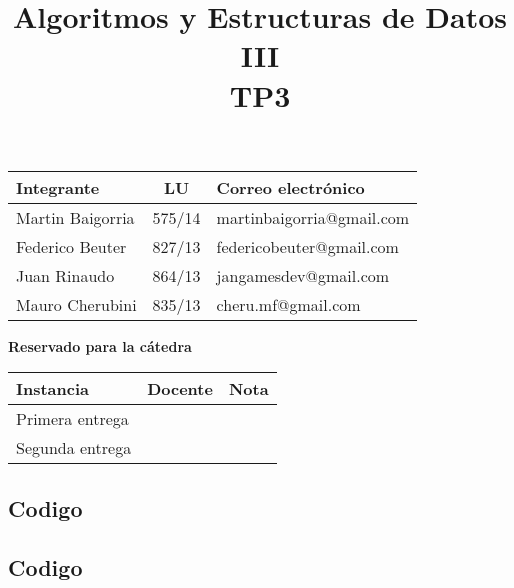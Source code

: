 \documentclass[10pt,a4paper]{article}
\title{Algoritmos y Estructuras de Datos III \\ TP3}
\begin{document}

\maketitle

\bigskip

\begin{table}[h]
\centering
\begin{tabular}{|l l l|}
\hline
Integrante       & \multicolumn{1}{c}{LU}     & Correo electrónico        \\ \hline
Martin Baigorria & \multicolumn{1}{c}{575/14} & martinbaigorria@gmail.com \\ 
Federico Beuter & 827/13                      & federicobeuter@gmail.com \\
Juan Rinaudo & 864/13                      & jangamesdev@gmail.com \\ 
Mauro Cherubini & 835/13                      & cheru.mf@gmail.com \\ \hline
\end{tabular}
\end{table}

\vfill

\begin{center}
\textbf{Reservado para la cátedra}
\end{center}
\begin{table}[h]
\centering
\begin{tabular}{|l|l|l|}
\hline
Instancia       & Docente & Nota \\ \hline
Primera entrega &         &      \\ \hline
Segunda entrega &         &      \\ \hline
\end{tabular}
\end{table}

\newpage
\tableofcontents
\newpage



\newpage


\newpage

\newpage
\subsection{Codigo}

\newpage


\newpage

\newpage
\subsection{Codigo}

\newpage


\newpage

\newpage


\newpage

\end{document}
